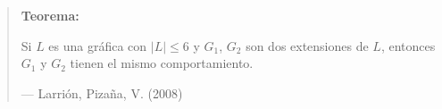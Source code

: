 \documentclass[beamer]{standalone}
\begin{document}
\begin{standaloneframe}
  \begin{quote}
    \textbf{Teorema:}

    Si $L$ es una gráfica con $|L|\leq 6$ y $G_{1}$, $G_{2}$ son dos
    extensiones de $L$, entonces $G_{1}$ y $G_{2}$ tienen el
    mismo comportamiento.

    \hfill--- \color{purple} Larrión, Pizaña, V. (2008)
  \end{quote}
\end{standaloneframe}
\end{document}
